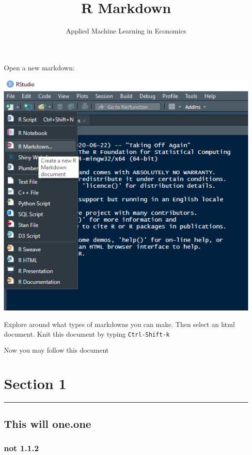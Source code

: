 \documentclass[
]{article}
\title{R Markdown}
\author{Applied Machine Learning in Economics}
\date{}
\begin{document}
\maketitle

{
\setcounter{tocdepth}{2}
\tableofcontents
}
Open a new markdown:

\includegraphics{new markdown.png}

Explore around what types of markdowns you can make. Then select an html
document. Knit this document by typing \texttt{Ctrl-Shift-k}

Now you may follow this document

\hypertarget{section-1}{%
\section{Section 1}\label{section-1}}

\begin{center}\rule{0.5\linewidth}{0.5pt}\end{center}

\hypertarget{this-will-one.one}{%
\subsection{This will one.one}\label{this-will-one.one}}

\hypertarget{not-1.1.2}{%
\subsubsection{not 1.1.2}\label{not-1.1.2}}
\end{document}

